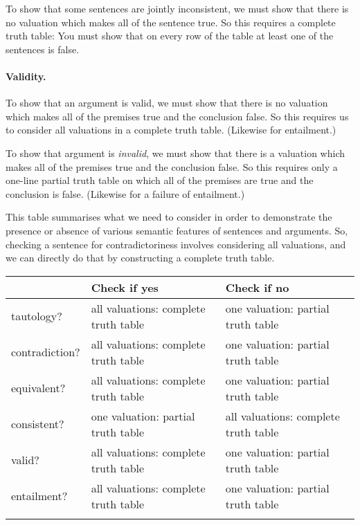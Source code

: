 To show that some sentences are jointly inconsistent, we must show that there is no valuation which makes all of the sentence true. So this requires a complete truth table: You must show that on every row of the table at least one of the sentences is false.

\paragraph{Validity.}
To show that an argument is valid, we must show that there is no valuation which makes all of the premises true and the conclusion false. So this  requires us to consider all valuations in a complete truth table.  (Likewise for entailment.)

To show that argument is \emph{invalid}, we must show that there is a valuation which makes all of the premises true and the conclusion false. So this requires only a one-line partial truth table on which all of the premises are true and the conclusion is false. (Likewise for a failure of entailment.)



This table summarises what we need to consider in order to demonstrate the presence or absence of various semantic features of sentences and arguments. So, checking a sentence for contradictoriness involves considering all valuations, and we can directly do that by constructing a complete truth table. 
\begin{center}
\begin{tabular}{l p{4cm} p{4cm}} \toprule 
 & \textbf{Check if yes} & \textbf{Check if no}\\
 \midrule
tautology? & all valuations: complete truth table & one valuation: partial truth table\\
contradiction? &  all valuations: complete truth table  & one valuation: partial truth table\\
equivalent? & all valuations: complete truth table & one valuation: partial truth table\\
consistent? & one valuation: partial truth table & all valuations: complete truth table\\
valid? & all valuations: complete truth table & one valuation: partial truth table\\
entailment? & all valuations: complete truth table & one valuation: partial truth table\\
\bottomrule \label{table.CompleteVsPartial}\end{tabular}
\end{center}


